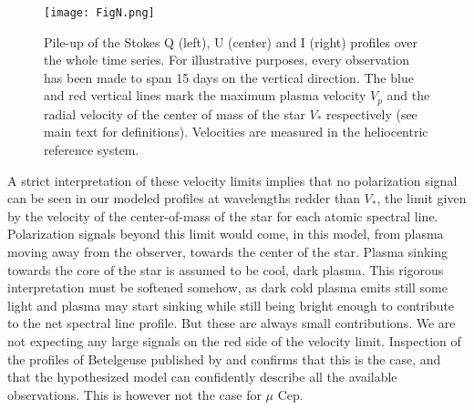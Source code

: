 \documentclass{/Users/art2/TeX/aanda/aa}
\def\kms {km\,s$^{-1}$}
\begin{document}
\begin{figure}
\texttt{[image: FigN.png]}
\caption{Pile-up of the Stokes Q (left), U (center) and I (right) profiles over the whole time series. For illustrative purposes, every observation has been made to span 15 days on the vertical direction. The blue and red vertical lines mark the maximum plasma velocity $V_p$ and the radial velocity of the center of mass of the star $V_*$ respectively (see main text for definitions). Velocities are measured in the heliocentric reference system. }
\label{velos}
\end{figure}



A strict interpretation of these  velocity limits  implies that no polarization signal can be seen  in our modeled profiles at wavelengths redder than $V_*$, the limit given by the velocity of the center-of-mass of the star for each atomic spectral line. Polarization signals beyond this limit would come, in this model, from plasma moving away from the observer, towards the center of the star. Plasma sinking towards the core of the star is assumed to be cool, dark plasma. This rigorous interpretation must be softened somehow, as dark cold plasma emits still some light and plasma may start sinking while still being bright enough to contribute to the net spectral line profile. But these are always small contributions. We are not expecting any large signals on the red side of the velocity limit. Inspection of the profiles of Betelgeuse published by \cite{Auriere_2016,Mathias:2018aa,LA18} and \cite{LA22} confirms that this is the case, and that the hypothesized model can confidently describe all the available observations.  This is however not the case for $\mu$ Cep. 
\end{document}
